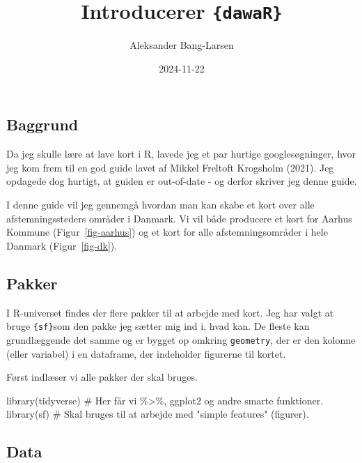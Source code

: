\documentclass[
  a4paper,
  DIV=11,
  numbers=noendperiod,
  oneside]{scrartcl}
\title{Introducerer \texttt{\{dawaR\}}}
\author{Aleksander Bang-Larsen}
\date{2024-11-22}
\newenvironment{Shaded}{\begin{snugshade}}{\end{snugshade}}
\newcommand{\CommentTok}[1]{\textcolor[rgb]{0.37,0.37,0.37}{#1}}
\newcommand{\FunctionTok}[1]{\textcolor[rgb]{0.28,0.35,0.67}{#1}}
\newcommand{\NormalTok}[1]{\textcolor[rgb]{0.00,0.23,0.31}{#1}}
\renewcommand*\contentsname{Indholdsfortegnelse}
\newcommand\contentsname{Indholdsfortegnelse}
\begin{document}
\maketitle

\renewcommand*\contentsname{Indholdsfortegnelse}
{
\hypersetup{linkcolor=}
\setcounter{tocdepth}{3}
\tableofcontents
}

\subsection{Baggrund}\label{baggrund}

Da jeg skulle lære at lave kort i R, lavede jeg et par hurtige
googlesøgninger, hvor jeg kom frem til en god guide lavet af Mikkel
Freltoft Krogsholm (2021). Jeg opdagede dog hurtigt, at guiden er
out-of-date - og derfor skriver jeg denne guide.

I denne guide vil jeg gennemgå hvordan man kan skabe et kort over alle
afstemningssteders områder i Danmark. Vi vil både producere et kort for
Aarhus Kommune (Figur~\ref{fig-aarhus}) og et kort for alle
afstemningsområder i hele Danmark (Figur~\ref{fig-dk}).

\subsection{Pakker}\label{pakker}

I R-universet findes der flere pakker til at arbejde med kort. Jeg har
valgt at bruge \texttt{\{sf\}}som den pakke jeg sætter mig ind i, hvad
kan. De fleste kan grundlæggende det samme og er bygget op omkring
\texttt{geometry}, der er den kolonne (eller variabel) i en dataframe,
der indeholder figurerne til kortet.

Først indlæser vi alle pakker der skal bruges.

\begin{Shaded}
\begin{Highlighting}[]
\FunctionTok{library}\NormalTok{(tidyverse)      }\CommentTok{\# Her får vi \%\textgreater{}\%, ggplot2 og andre smarte funktioner.}
\FunctionTok{library}\NormalTok{(sf)             }\CommentTok{\# Skal bruges til at arbejde med "simple features" (figurer).}
\end{Highlighting}
\end{Shaded}

\subsection{Data}\label{data}
\end{document}
